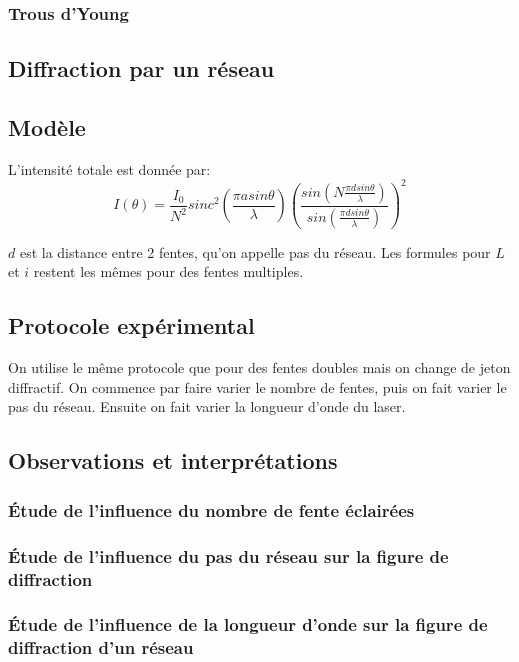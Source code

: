 \documentclass[12pt]{article}
\begin{document}
\subsubsection{Trous d'Young}

\subsection{Diffraction par un réseau}


\subsection{Modèle}
L'intensité totale est donnée par:
\begin{equation}
    I(\theta)=\frac{I_0}{N^2}sinc^2(\frac{\pi a sin \theta}{\lambda})(\frac{sin(N\frac{\pi d sin \theta}{\lambda})}{sin(\frac{\pi d sin \theta}{\lambda})})^2
\end{equation}

$d$ est la distance entre 2 fentes, qu'on appelle pas du réseau. Les formules pour $L$ et $i$ restent les mêmes pour des fentes multiples. 

\subsection{Protocole expérimental}
On utilise le même protocole que pour des fentes doubles mais on change de jeton diffractif. On commence par faire varier  le nombre de fentes, puis on fait varier le pas du réseau. Ensuite on fait varier la longueur d'onde du laser.

\subsection{Observations et interprétations}

\subsubsection{Étude de l'influence du nombre de fente éclairées}

\subsubsection{Étude de l'influence du pas du réseau sur la figure de diffraction}

\subsubsection{Étude de l'influence de la longueur d'onde sur la figure de diffraction d'un réseau}
\end{document}
